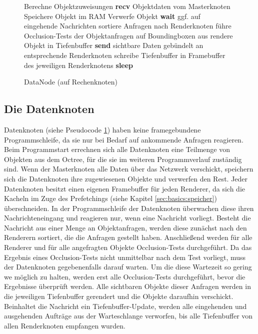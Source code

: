\begin{figure}[ttt!]
\centering
 \begin{minipage}[t]{12cm}
\begin{algorithm}[H]
  \caption{DataNode (auf Rechenknoten)\label{alg:impl:datanode}} 
    \begin{algorithmic} [1]
      \STATE Berechne Objektzuweisungen
      \STATE \textbf{recv} Objektdaten vom Masterknoten
	\STATE Speichere Objekt im RAM
      \ELSE
	\STATE Verwerfe Objekt
      \ENDIF
	\STATE \textbf{wait} ggf. auf eingehende Nachrichten
	  \STATE sortiere Anfragen nach Renderknoten
	    \STATE führe Occlusion-Tests der Objektanfragen auf Boundingboxen aus
	  \ENDFOR
	    \STATE rendere Objekt in Tiefenbuffer
 	  \ENDFOR
	  \STATE \textbf{send} sichtbare Daten gebündelt an entsprechende Renderknoten
	  \STATE schreibe Tiefenbuffer in Framebuffer des jeweiligen Renderknotens
	\ELSE \STATE\textbf{sleep}
	\ENDIF
      \ENDWHILE
    \end{algorithmic}
\end{algorithm}
 \end{minipage}
\end{figure}

\subsection{Die Datenknoten}
\label{sec:impl:daten}
Datenknoten (siehe Pseudocode \ref{alg:impl:datanode}) haben keine framegebundene Programmschleife, da sie nur bei Bedarf auf ankommende Anfragen reagieren. Beim Programmstart errechnen sich alle Datenknoten eine Teilmenge von Objekten aus dem Octree, für die sie im weiteren Programmverlauf zuständig sind. Wenn der Masterknoten alle Daten über das Netzwerk verschickt, speichern sich die Datenknoten ihre zugewiesenen Objekte und verwerfen den Rest. Jeder Datenknoten besitzt einen eigenen Framebuffer für jeden Renderer, da sich die Kacheln im Zuge des Prefetchings (siehe Kapitel \ref{sec:basics:speicher}) überschneiden. In der Programmschleife der Datenknoten überwachen diese ihren Nachrichteneingang und reagieren nur, wenn eine Nachricht vorliegt. Besteht die Nachricht aus einer Menge an Objektanfragen, werden diese zunächst nach den Renderern sortiert, die die Anfragen gestellt haben. Anschließend werden für alle Renderer und für alle angefragten Objekte Occlusion-Tests durchgeführt. Da das Ergebnis eines Occlusion-Tests nicht unmittelbar nach dem Test vorliegt, muss der Datenknoten gegebenenfalls darauf warten. Um die diese Wartezeit so gering we möglich zu halten, werden erst alle Occlusion-Tests durchgeführt, bevor die Ergebnisse überprüft werden. Alle sichtbaren Objekte dieser Anfragen werden in die jeweiligen Tiefenbuffer gerendert und die Objekte daraufhin verschickt. Beinhaltet die Nachricht ein Tiefenbuffer-Update, werden alle eingehenden und ausgehenden Aufträge aus der Warteschlange verworfen, bis alle Tiefenbuffer von allen Renderknoten empfangen wurden.

